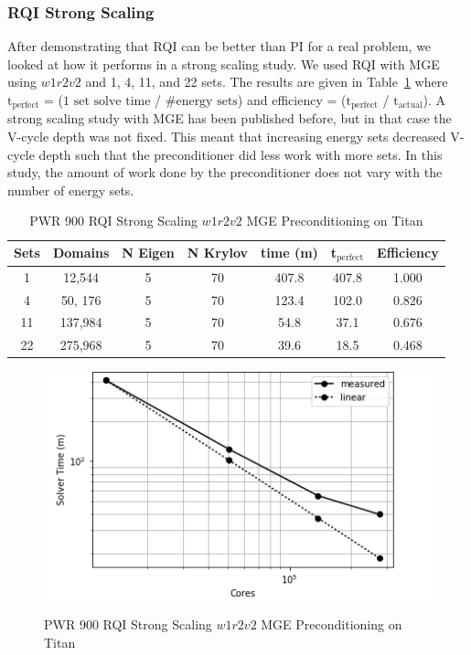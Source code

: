 \documentclass{article}                                                                           %
\begin{document}
\subsubsection{RQI Strong Scaling}
After demonstrating that RQI can be better than PI for a real problem, we looked at how it performs in a strong scaling study. 
We used RQI with MGE using $w1r2v2$ and 1, 4, 11, and 22 sets. 
The results are given in Table~\ref{tab:PWR rqi strong scaling} where $\text{t}_{\text{perfect}}$ = ($\text{1 set solve time}$ / $\text{\# energy sets}$) and efficiency = ($\text{t}_{\text{perfect}}$ / $\text{t}_{\text{actual}}$). 
A strong scaling study with MGE has been published before, but in that case the V-cycle depth was not fixed.
This meant that increasing energy sets decreased V-cycle depth such that the preconditioner did less work with more sets. 
In this study, the amount of work done by the preconditioner does not vary with the number of energy sets. 
\begin{table}[!h]
\caption{PWR 900 RQI Strong Scaling $w1r2v2$ MGE Preconditioning on Titan}
  \begin{center}
    \begin{tabular}{| c | c | c | c | c | c | c |}
     \hline
      Sets & Domains & N Eigen & N Krylov & time (m) & t$_{\text{perfect}}$ & Efficiency \\\hline
      1   & 12,544    & 5 & 70 & 407.8 & 407.8 & 1.000 \\
      4   & 50, 176   & 5 & 70 & 123.4 & 102.0 & 0.826\\
      11  & 137,984 & 5 & 70 & 54.8  & 37.1  & 0.676\\
      22  & 275,968 & 5 & 70 & 39.6  & 18.5  & 0.468\\
      \hline
    \end{tabular}
    \label{tab:PWR rqi strong scaling}
  \end{center}
\end{table}
%
\begin{figure}
\caption{PWR 900 RQI Strong Scaling $w1r2v2$ MGE Preconditioning on Titan}
\includegraphics[scale=.75]{Results/pwr}
\centering
\label{fig:pwr-scaling}
\end{figure}
\end{document}
